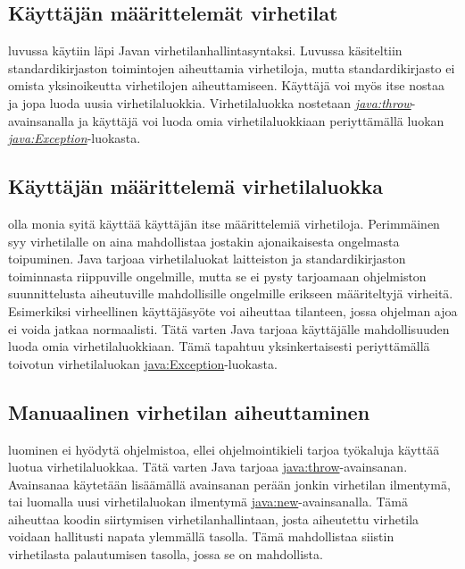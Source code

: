 \documentclass[a4paper,justified,notoc]{tufte-book}
\newcommand{\java}[1]{\underline{\gls{java:#1}}}
\newcommand{\newjava}[1]{\textit{\java{#1}}}
\begin{document}
\begin{fullwidth}

\section{Käyttäjän määrittelemät virhetilat}
\label{exception}

 luvussa  käytiin läpi Javan
virhetilanhallintasyntaksi. Luvussa käsiteltiin standardikirjaston toimintojen aiheuttamia
virhetiloja, mutta standardikirjasto ei omista yksinoikeutta virhetilojen aiheuttamiseen. Käyttäjä
voi myös itse nostaa ja jopa luoda uusia virhetilaluokkia. Virhetilaluokka nostetaan
\newjava{throw}-avainsanalla ja käyttäjä voi luoda omia virhetilaluokkiaan periyttämällä luokan
\newjava{Exception}-luokasta.

\subsection{Käyttäjän määrittelemä virhetilaluokka}
\label{exception}

 olla monia syitä käyttää käyttäjän itse määrittelemiä virhetiloja.
Perimmäinen syy virhetilalle on aina mahdollistaa jostakin ajonaikaisesta ongelmasta toipuminen.
Java tarjoaa virhetilaluokat laitteiston ja standardikirjaston toiminnasta riippuville ongelmille,
mutta se ei pysty tarjoamaan ohjelmiston suunnittelusta aiheutuville mahdollisille ongelmille
erikseen määriteltyjä virheitä. Esimerkiksi virheellinen käyttäjäsyöte voi aiheuttaa tilanteen,
jossa ohjelman ajoa ei voida jatkaa normaalisti. Tätä varten Java tarjoaa käyttäjälle
mahdollisuuden luoda omia virhetilaluokkiaan. Tämä tapahtuu yksinkertaisesti periyttämällä
toivotun virhetilaluokan \java{Exception}-luokasta.

\subsection{Manuaalinen virhetilan aiheuttaminen}
\label{throws}

 luominen ei hyödytä ohjelmistoa, ellei ohjelmointikieli tarjoa
työkaluja käyttää luotua virhetilaluokkaa. Tätä varten Java tarjoaa \java{throw}-avainsanan.
Avainsanaa käytetään lisäämällä avainsanan perään jonkin virhetilan ilmentymä, tai luomalla uusi
virhetilaluokan ilmentymä \java{new}-avainsanalla. Tämä aiheuttaa koodin siirtymisen
virhetilanhallintaan, josta aiheutettu virhetila voidaan hallitusti napata ylemmällä tasolla. Tämä
mahdollistaa siistin virhetilasta palautumisen tasolla, jossa se on mahdollista. 


\end{fullwidth}
\end{document}
